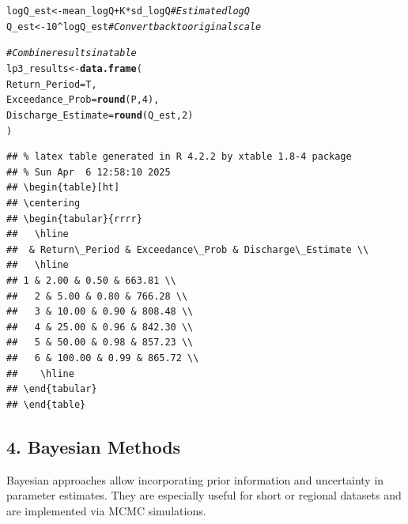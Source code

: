 \documentclass{tufte-handout}\usepackage[]{graphicx}\usepackage[]{xcolor}
\makeatletter
\newcommand{\hlnum}[1]{\textcolor[rgb]{0.686,0.059,0.569}{#1}}%
\newcommand{\hlcom}[1]{\textcolor[rgb]{0.678,0.584,0.686}{\textit{#1}}}%
\newcommand{\hlopt}[1]{\textcolor[rgb]{0,0,0}{#1}}%
\newcommand{\hlstd}[1]{\textcolor[rgb]{0.345,0.345,0.345}{#1}}%
\newcommand{\hlkwb}[1]{\textcolor[rgb]{0.69,0.353,0.396}{#1}}%
\newcommand{\hlkwc}[1]{\textcolor[rgb]{0.333,0.667,0.333}{#1}}%
\newcommand{\hlkwd}[1]{\textcolor[rgb]{0.737,0.353,0.396}{\textbf{#1}}}%
\newenvironment{kframe}{%
 \def\at@end@of@kframe{}%
 \ifinner\ifhmode%
  \def\at@end@of@kframe{\end{minipage}}%
  \begin{minipage}{\columnwidth}%
 \fi\fi%
 \def\FrameCommand##1{\hskip\@totalleftmargin \hskip-\fboxsep
 \colorbox{shadecolor}{##1}\hskip-\fboxsep
     \hskip-\linewidth \hskip-\@totalleftmargin \hskip\columnwidth}%
 \MakeFramed {\advance\hsize-\width
   \@totalleftmargin\z@ \linewidth\hsize
   \@setminipage}}%
 {\par\unskip\endMakeFramed%
 \at@end@of@kframe}
\newenvironment{knitrout}{}{} %
\makeatother
\begin{document}
\begin{knitrout}
\begin{kframe}
\begin{alltt}
\hlstd{logQ_est} \hlkwb{<-} \hlstd{mean_logQ} \hlopt{+} \hlstd{K} \hlopt{*} \hlstd{sd_logQ}       \hlcom{# Estimated logQ}
\hlstd{Q_est} \hlkwb{<-} \hlnum{10}\hlopt{^}\hlstd{logQ_est}                      \hlcom{# Convert back to original scale}

\hlcom{# Combine results in a table}
\hlstd{lp3_results} \hlkwb{<-} \hlkwd{data.frame}\hlstd{(}
  \hlkwc{Return_Period} \hlstd{= T,}
  \hlkwc{Exceedance_Prob} \hlstd{=} \hlkwd{round}\hlstd{(P,} \hlnum{4}\hlstd{),}
  \hlkwc{Discharge_Estimate} \hlstd{=} \hlkwd{round}\hlstd{(Q_est,} \hlnum{2}\hlstd{)}
\hlstd{)}
\end{alltt}
\end{kframe}
\end{knitrout}

\begin{knitrout}
\color{fgcolor}\begin{kframe}
\begin{verbatim}
## % latex table generated in R 4.2.2 by xtable 1.8-4 package
## % Sun Apr  6 12:58:10 2025
## \begin{table}[ht]
## \centering
## \begin{tabular}{rrrr}
##   \hline
##  & Return\_Period & Exceedance\_Prob & Discharge\_Estimate \\ 
##   \hline
## 1 & 2.00 & 0.50 & 663.81 \\ 
##   2 & 5.00 & 0.80 & 766.28 \\ 
##   3 & 10.00 & 0.90 & 808.48 \\ 
##   4 & 25.00 & 0.96 & 842.30 \\ 
##   5 & 50.00 & 0.98 & 857.23 \\ 
##   6 & 100.00 & 0.99 & 865.72 \\ 
##    \hline
## \end{tabular}
## \end{table}
\end{verbatim}
\end{kframe}
\end{knitrout}

\subsection{4. Bayesian Methods}

Bayesian approaches allow incorporating prior information and uncertainty in parameter estimates. They are especially useful for short or regional datasets and are implemented via MCMC simulations.
\end{document}
